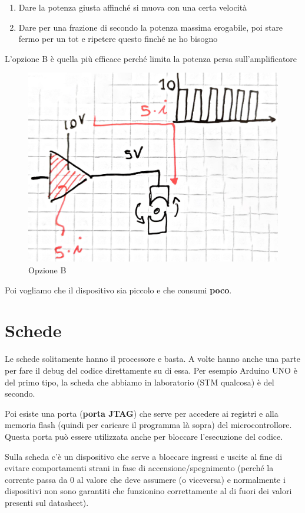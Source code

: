 \documentclass[
]{book}
\providecommand{\tightlist}{%
  \setlength{\itemsep}{0pt}\setlength{\parskip}{0pt}}
\begin{document}
\begin{enumerate}
\def\labelenumi{\alph{enumi}.}
\tightlist
\item
  Dare la potenza giusta affinché si muova con una certa velocità
\item
  Dare per una frazione di secondo la potenza massima erogabile, poi
  stare fermo per un tot e ripetere questo finché ne ho bisogno
\end{enumerate}

L'opzione B è quella più efficace perché limita la potenza persa
sull'amplificatore

\begin{figure}
\centering
\includegraphics[width=0.5\linewidth,height=\textheight,keepaspectratio]{immagini/49.jpg}
\caption{Opzione B}
\end{figure}

Poi vogliamo che il dispositivo sia piccolo e che consumi \textbf{poco}.

\section{Schede}\label{schede}

Le schede solitamente hanno il processore e basta. A volte hanno anche
una parte per fare il debug del codice direttamente su di essa. Per
esempio Arduino UNO è del primo tipo, la scheda che abbiamo in
laboratorio (STM qualcosa) è del secondo.

Poi esiste una porta (\textbf{porta JTAG}) che serve per accedere ai
registri e alla memoria flash (quindi per caricare il programma là
sopra) del microcontrollore. Questa porta può essere utilizzata anche
per bloccare l'esecuzione del codice.

Sulla scheda c'è un dispositivo che serve a bloccare ingressi e uscite
al fine di evitare comportamenti strani in fase di
accensione/spegnimento (perché la corrente passa da 0 al valore che deve
assumere (o viceversa) e normalmente i dispositivi non sono garantiti
che funzionino correttamente al di fuori dei valori presenti sul
datasheet).
\end{document}
